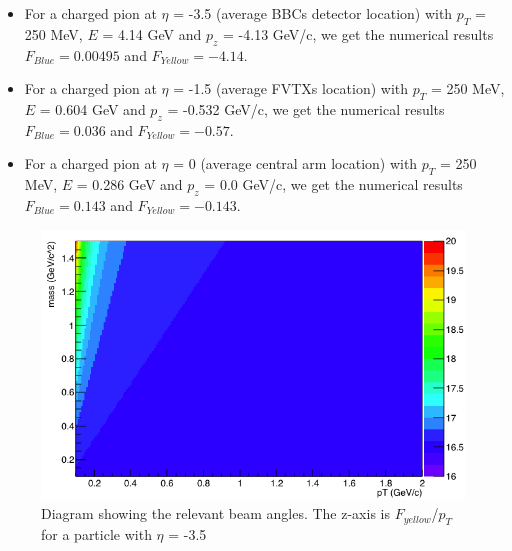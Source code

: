 \documentclass[12pt,oneside,openary]{article}
\begin{document}
\begin{itemize}
\item For a charged pion at $\eta$ = -3.5 (average BBCs detector location) with $p_T$ = 250 MeV, $E$ = 4.14 GeV and $p_z$ = -4.13 GeV/c, we get the numerical results
$F_{Blue} = 0.00495$
and 
$F_{Yellow} = -4.14$.


\item For a charged pion at $\eta$ = -1.5 (average FVTXs location) with $p_T$ = 250 MeV, $E$ = 0.604 GeV and $p_z$  = -0.532 GeV/c, we get the numerical results
$F_{Blue} =0.036$
and 
$F_{Yellow} = -0.57$.


\item For a charged pion at $\eta$ = 0 (average central arm location) with $p_T$ = 250 MeV, $E$ = 0.286 GeV and $p_z$  = 0.0 GeV/c, we get the numerical results
$F_{Blue} =0.143$
and 
$F_{Yellow} = -0.143$.
\end{itemize}
\begin{figure}[h!]
\begin{center}
\includegraphics[width=0.75\linewidth]{pt_mass_dep_coeff.png}
\caption{Diagram showing the relevant beam angles. The z-axis is $F_{yellow}$/$p_T$ for a particle with $\eta$ = -3.5}
\label{fig:diagram1}
\end{center}
\end{figure}

\end{document}
